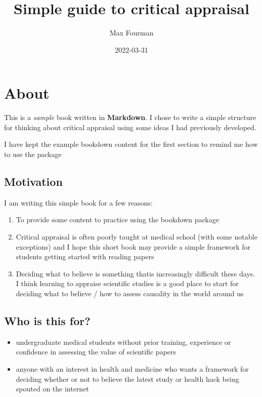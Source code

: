 \documentclass[
]{book}
\title{Simple guide to critical appraisal}
\author{Max Fourman}
\date{2022-03-31}
\providecommand{\tightlist}{%
  \setlength{\itemsep}{0pt}\setlength{\parskip}{0pt}}
\theoremstyle{definition}
\theoremstyle{definition}
\theoremstyle{definition}
\theoremstyle{definition}
\theoremstyle{remark}
\begin{document}
\maketitle

{
\setcounter{tocdepth}{1}
\tableofcontents
}
\hypertarget{about}{%
\chapter{About}\label{about}}

This is a \emph{sample} book written in \textbf{Markdown}. I chose to write a simple structure for thinking about critical appraisal using some ideas I had previously developed.

I have kept the example bookdown content for the first section to remind me how to use the package

\hypertarget{motivation}{%
\section{Motivation}\label{motivation}}

I am writing this simple book for a few reasons:

\begin{enumerate}
\def\labelenumi{\arabic{enumi})}
\tightlist
\item
  To provide some content to practice using the bookdown package
\item
  Critical appraisal is often poorly taught at medical school (with some notable exceptions) and I hope this short book may provide a simple framework for students getting started with reading papers
\item
  Deciding what to believe is something thatis increasingly difficult these days. I think learning to appraise scientific studies is a good place to start for deciding what to believe / how to assess causality in the world around us
\end{enumerate}

\hypertarget{who-is-this-for}{%
\section{Who is this for?}\label{who-is-this-for}}

\begin{itemize}
\tightlist
\item
  undergraduate medical students without prior training, experience or confidence in assessing the value of scientific papers
\item
  anyone with an interest in health and medicine who wants a framework for deciding whether or not to believe the latest study or health hack being spouted on the internet
\end{itemize}
\end{document}
